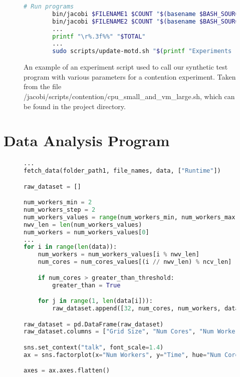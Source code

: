 \begin{appendices}
\begin{figure}
\begin{lstlisting}[language=bash]
        # Run programs
        bin/jacobi $FILENAME1 $COUNT "$(basename $BASH_SOURCE .sh)_1" >> $LOG_FILENAME1 &
        bin/jacobi $FILENAME2 $COUNT "$(basename $BASH_SOURCE .sh)_2" >> $LOG_FILENAME2
        ...
        printf "\r%.3f%%" "$TOTAL"
        ...
        sudo scripts/update-motd.sh "$(printf "Experiments running! %.3f%% complete" "$TOTAL")" | tee $LOG_FILENAME1 $LOG_FILENAME2 > /dev/null
\end{lstlisting}
\caption{An example of an experiment script used to call our synthetic test program with various parameters for a contention experiment. Taken from the file /jacobi/scripts/contention/cpu\_small\_and\_vm\_large.sh, which can be found in the project directory.}
\label{fig:experiment_script}
\end{figure}



\chapter{Data Analysis Program}
\label{appendix:data_analysis_program}

\begin{figure}
\begin{lstlisting}[language=python]
...
fetch_data(folder_path1, file_names, data, ["Runtime"])

raw_dataset = []

num_workers_min = 2
num_workers_step = 2
num_workers_values = range(num_workers_min, num_workers_max + num_workers_step, num_workers_step)
nwv_len = len(num_workers_values)
num_workers = num_workers_values[0]
...
for i in range(len(data)):
    num_workers = num_workers_values[i % nwv_len]
    num_cores = num_cores_values[(i // nwv_len) % ncv_len]

    if num_cores > greater_than_threshold:
        greater_than = True

    for j in range(1, len(data[i])):
        raw_dataset.append([32, num_cores, num_workers, data[i].values[j][0], greater_than])

raw_dataset = pd.DataFrame(raw_dataset)
raw_dataset.columns = ["Grid Size", "Num Cores", "Num Workers", "Time", "Num Cores Greater Than Physical Cores"]

sns.set_context("talk", font_scale=1.4)
ax = sns.factorplot(x="Num Workers", y="Time", hue="Num Cores", col="Num Cores Greater Than Physical Cores", size=10, scale=0.8, ci=95, data=raw_dataset);

axes = ax.axes.flatten()


\end{lstlisting}
\end{figure}
\end{appendices}
